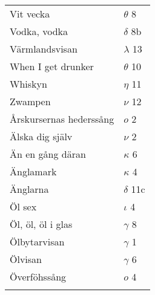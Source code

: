 \documentclass[a6paper,10pt]{article}
\begin{document}
\begin{table}[!h]
\begin{tabular}{l l}
Vit vecka	&$\theta$ 8\\
Vodka, vodka	&$\delta$ 8b\\
Värmlandsvisan	&$\lambda$ 13\\
When I get drunker	&$\theta$ 10\\
Whiskyn	&$\eta$ 11\\
Zwampen&	$\nu$ 12\\
Årskursernas hederssång&$o$ 2\\
Älska dig själv&$\nu$ 2\\
Än en gång däran&$\kappa$ 6\\
Änglamark&$\kappa$ 4\\
Änglarna&$\delta$ 11c\\
Öl sex&	$\iota$ 4\\
Öl, öl, öl i glas	&$\gamma$ 8\\
Ölbytarvisan	&$\gamma$ 1\\
Ölvisan&$\gamma$ 6\\
Överföhssång&	$o$ 4\\
\vspace{180pt}
\end{tabular}
\end{table}
\end{document}
